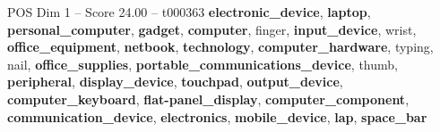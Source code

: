 \begin{textsample}{POS Dim 1 – Score 24.00 – t000363}  \label{ex:f1_pos_029}
\textbf{electronic\_device}, \textbf{laptop}, \textbf{personal\_computer}, \textbf{gadget}, \textbf{computer}, finger, \textbf{input\_device}, wrist, \textbf{office\_equipment}, \textbf{netbook}, \textbf{technology}, \textbf{computer\_hardware}, typing, nail, \textbf{office\_supplies}, \textbf{portable\_communications\_device}, thumb, \textbf{peripheral}, \textbf{display\_device}, \textbf{touchpad}, \textbf{output\_device}, \textbf{computer\_keyboard}, \textbf{flat-panel\_display}, \textbf{computer\_component}, \textbf{communication\_device}, \textbf{electronics}, \textbf{mobile\_device}, \textbf{lap}, \textbf{space\_bar}

\end{textsample}
